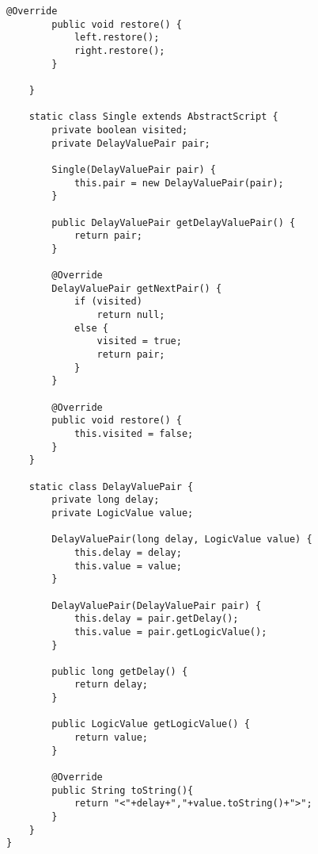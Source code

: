 \begin{lstlisting}[caption=ElementDictionary, label=listing7]
		@Override
		public void restore() {
			left.restore();
			right.restore();
		}

	}

	static class Single extends AbstractScript {
		private boolean visited;
		private DelayValuePair pair;

		Single(DelayValuePair pair) {
			this.pair = new DelayValuePair(pair);
		}

		public DelayValuePair getDelayValuePair() {
			return pair;
		}

		@Override
		DelayValuePair getNextPair() {
			if (visited)
				return null;
			else {
				visited = true;
				return pair;
			}
		}

		@Override
		public void restore() {
			this.visited = false;
		}
	}

	static class DelayValuePair {
		private long delay;
		private LogicValue value;

		DelayValuePair(long delay, LogicValue value) {
			this.delay = delay;
			this.value = value;
		}

		DelayValuePair(DelayValuePair pair) {
			this.delay = pair.getDelay();
			this.value = pair.getLogicValue();
		}

		public long getDelay() {
			return delay;
		}

		public LogicValue getLogicValue() {
			return value;
		}
		
		@Override
		public String toString(){
			return "<"+delay+","+value.toString()+">";
		}
	}
}
\end{lstlisting}


